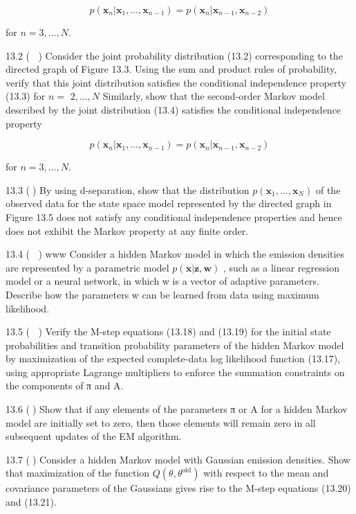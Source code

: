\documentclass[
  10
]{article}
\begin{document}
\[
p (\mathbf {x} _ {n} | \mathbf {x} _ {1}, \ldots , \mathbf {x} _ {n - 1}) = p (\mathbf {x} _ {n} | \mathbf {x} _ {n - 1}, \mathbf {x} _ {n - 2})\tag{13.122}
\]

for \(n = 3 , \ldots , N .\)

13.2 ( ) Consider the joint probability distribution (13.2)
corresponding to the directed graph of Figure 13.3. Using the sum and
product rules of probability, verify that this joint distribution
satisfies the conditional independence property (13.3) for \(n =\)
\(2 , \ldots , N\) Similarly, show that the second-order Markov model
described by the joint distribution (13.4) satisfies the conditional
independence property

\[
p (\mathbf {x} _ {n} | \mathbf {x} _ {1}, \dots , \mathbf {x} _ {n - 1}) = p (\mathbf {x} _ {n} | \mathbf {x} _ {n - 1}, \mathbf {x} _ {n - 2})\tag{13.123}
\]

for \(n = 3 , \ldots , N .\)

13.3 () By using d-separation, show that the distribution
\(p ( \mathbf { x } _ { 1 } , \ldots , \mathbf { x } _ { N } )\) of the
observed data for the state space model represented by the directed
graph in Figure 13.5 does not satisfy any conditional independence
properties and hence does not exhibit the Markov property at any finite
order.

13.4 ( ) www Consider a hidden Markov model in which the emission
densities are represented by a parametric model
\(p ( \mathbf { x } | \mathbf { z } , \mathbf { w } )\) , such as a
linear regression model or a neural network, in which w is a vector of
adaptive parameters. Describe how the parameters w can be learned from
data using maximum likelihood.

13.5 ( ) Verify the M-step equations (13.18) and (13.19) for the initial
state probabilities and transition probability parameters of the hidden
Markov model by maximization of the expected complete-data log
likelihood function (13.17), using appropriate Lagrange multipliers to
enforce the summation constraints on the components of π and A.

13.6 () Show that if any elements of the parameters π or A for a hidden
Markov model are initially set to zero, then those elements will remain
zero in all subsequent updates of the EM algorithm.

13.7 () Consider a hidden Markov model with Gaussian emission densities.
Show that maximization of the function
\(Q ( \theta , \theta ^ { \mathrm { o l d } } )\) with respect to the
mean and covariance parameters of the Gaussians gives rise to the M-step
equations (13.20) and (13.21).
\end{document}
